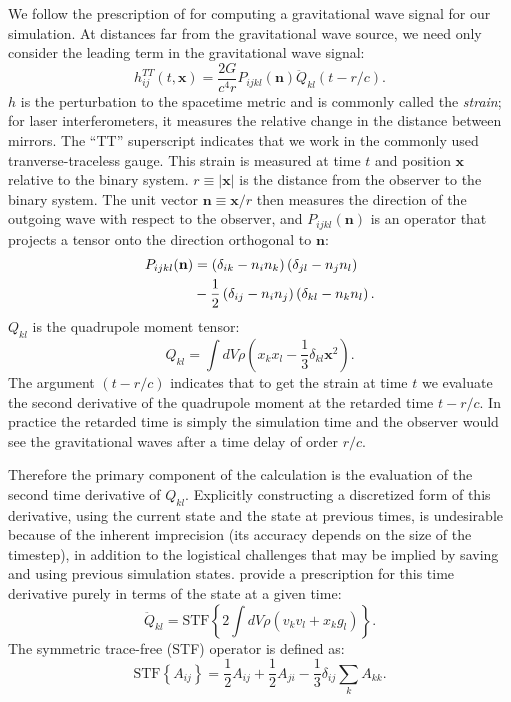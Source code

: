 \documentclass[12pt]{article}
\begin{document}
We follow the prescription of \citet{blanchet:1990} for computing a gravitational wave
signal for our simulation. At distances far from the
gravitational wave source, we need only consider the leading term in the gravitational
wave signal:
\begin{equation}
  h^{TT}_{ij}(t,\mathbf{x}) = \frac{2G}{c^4 r}P_{ijkl}(\mathbf{n}) \ddot{Q}_{kl}(t - r/c).
\end{equation}
$h$ is the perturbation to the spacetime metric and is commonly called the \textit{strain};
for laser interferometers, it measures the relative change in the distance between mirrors.
The ``TT'' superscript indicates that we work in the commonly used tranverse-traceless gauge.
This strain is measured at time $t$ and position $\mathbf{x}$ relative to the binary system.
$r\equiv |\mathbf{x}|$ is the distance from the observer to the binary system. The unit vector
$\mathbf{n} \equiv \mathbf{x} / r$ then measures the direction of the outgoing wave with
respect to the observer, and $P_{ijkl}(\mathbf{n})$ is an operator that projects a tensor
onto the direction orthogonal to $\mathbf{n}$:
\begin{align}
  P_{ijkl}(\mathbf{n}) &= \left(\delta_{ik} - n_i n_k\right)\left(\delta_{jl} - n_j n_l\right) \notag \\
                      &- \frac{1}{2}\left(\delta_{ij} - n_i n_j\right)\left( \delta_{kl} - n_k n_l\right).
\end{align}
$Q_{kl}$ is the quadrupole moment tensor:
\begin{equation}
  Q_{kl} = \int dV \rho \left(x_k x_l - \frac{1}{3}\delta_{kl} \mathbf{x}^2\right).
\end{equation}
The argument $(t - r/c)$ indicates that to get the strain at time $t$ we evaluate the second derivative of the
quadrupole moment at the retarded time $t - r/c$. In practice the retarded time is simply the simulation time
and the observer would see the gravitational waves after a time delay of order $r/c$.

Therefore the primary component of the calculation is the evaluation of the second time derivative of $Q_{kl}$.
Explicitly constructing a discretized form of this derivative, using the current state and the state at
previous times, is undesirable because of the inherent imprecision (its accuracy depends on the size of the timestep),
in addition to the logistical challenges that may be implied by saving and using previous simulation states.
\citet{blanchet:1990} provide a prescription for this time derivative purely in terms of the state at a given time:
\begin{equation}
  \ddot{Q}_{kl} = \text{STF}\left\{2\int dV \rho (v_k v_l + x_k g_l)\right\}.
\end{equation}
The symmetric trace-free (STF) operator is defined as:
\begin{equation}
  \text{STF}\left\{A_{ij}\right\} = \frac{1}{2}A_{ij} + \frac{1}{2}A_{ji} - \frac{1}{3} \delta_{ij} \sum_{k}A_{kk}.
\end{equation}
\end{document}
